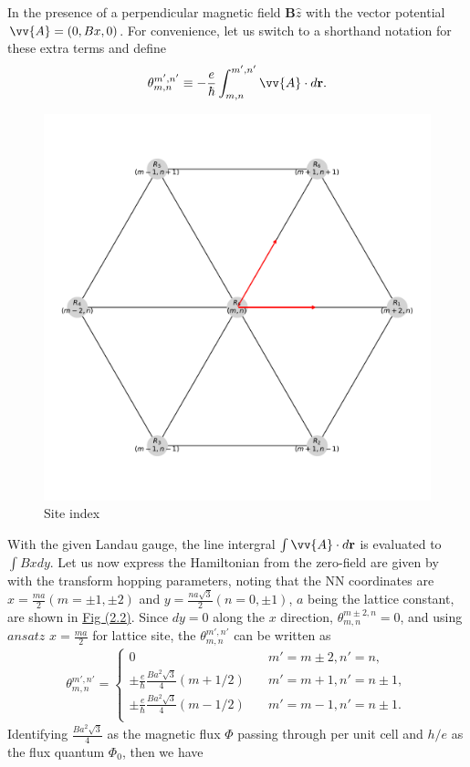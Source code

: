 \documentclass{report}
\newcommand{\f}[2]{\dfrac{#1}{#2}}
\begin{document}
In the presence of a perpendicular magnetic field $\mathbf{B} \hat{z}$ with the vector potential $\vv{A} = (0, Bx, 0)$. For convenience, let us switch to a shorthand notation for these extra terms and define
\begin{gather}
	\theta_{m,n}^{m',n'} \equiv - \f{e}{\hbar} \int_{m,n}^{m',n'} \vv{A} \cdot d\mathbf{r}.
\end{gather}
\begin{figure}[H]
	\centering
	\includegraphics[width=0.5\linewidth,height=0.5\linewidth]{pic/siteindice.pdf}
	\caption{\label{fig:site index} Site index}
\end{figure}
With the given Landau gauge, the line intergral $\int \vv{A} \cdot d\mathbf{r}$ is evaluated to $\int Bx dy$. Let us now express the Hamiltonian from the zero-field are given by \cite{PhysRevB.88.085433} with the transform hopping parameters, noting that the NN coordinates are $x = \frac{ma}{2}(m = \pm 1, \pm 2)$ and $y = \frac{na\sqrt{3}}{2}(n = 0,\pm 1)$, $a$ being the lattice constant, are shown in \hyperref[fig:site index]{Fig (2.2)}. Since $dy = 0$ along the $x$ direction, $\theta_{m,n}^{m \pm 2, n} = 0$, and using $ansatz$ $x = \frac{ma}{2}$ for lattice site, the $\theta_{m,n}^{m',n'}$ can be written as
\begin{gather}
	\theta_{m,n}^{m',n'} =
	\begin{cases}
		0                                                         & \quad m' = m \pm 2, n' = n  ,   \\
		\pm \frac{e}{\hbar} \frac{B a^{2} \sqrt{3}}{4} (m + 1 /2) & \quad m' = m + 1, n' = n \pm 1 ,\\
		\pm \frac{e}{\hbar} \frac{B a^{2} \sqrt{3}}{4} (m - 1 /2) & \quad m' = m - 1, n' = n \pm 1. \\
	\end{cases}
\end{gather}
Identifying $\frac{B a^{2} \sqrt{3}}{4}$ as the magnetic flux $\Phi$ passing through per unit cell and $h / e$ as the flux quantum $\Phi_{0}$, then we have
\end{document}
